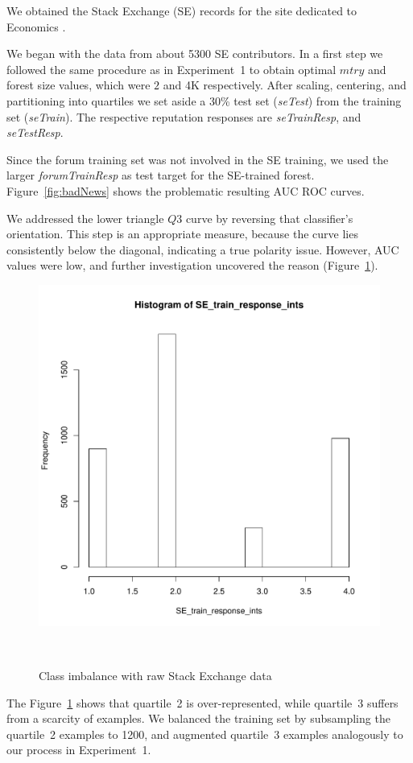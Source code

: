 We obtained the Stack Exchange (SE) records for the site dedicated to
Economics \cite{stackex}. 

We began with the data from about 5300 SE contributors. In a first
step we followed the same procedure as in Experiment~1 to obtain
optimal $mtry$ and forest size values, which were $2$ and 4K
respectively. After scaling, centering, and partitioning into
quartiles we set aside a 30\% test set (\emph{seTest}) from the training
set (\emph{seTrain}). The respective reputation responses are
\emph{seTrainResp}, and \emph{seTestResp}.

Since the forum training set was not involved in the SE training, we
used the larger \emph{forumTrainResp} as test target for the SE-trained
forest. Figure~\ref{fig:badNews} shows the problematic resulting AUC
ROC curves.

We addressed the lower triangle $Q3$ curve by reversing that
classifier's orientation. This step is an appropriate measure, because
the curve lies consistently below the diagonal, indicating a true
polarity issue. However, AUC values were low, and further
investigation uncovered the reason (Figure~\ref{fig:badHist}).
\begin{figure}[H]
\centering
  \includegraphics[width=0.8\columnwidth]{Figs/SE_bad_sample_balance_hist.pdf}
  \caption{Class imbalance with raw Stack Exchange data}
  ~\label{fig:badHist}
  \end{figure}
  


The Figure~\ref{fig:badHist} shows that quartile~2 is over-represented, while quartile~3
suffers from a scarcity of examples. We balanced the training set by
subsampling the quartile~2 examples to 1200, and augmented quartile~3
examples analogously to our process in Experiment~1.

